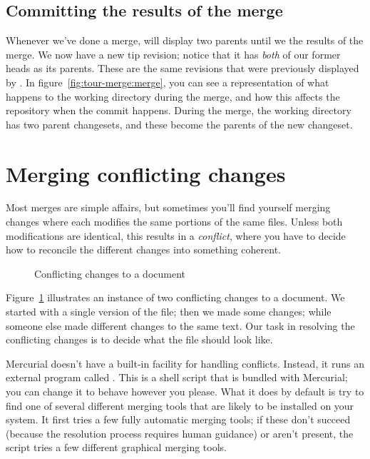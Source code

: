 \subsection{Committing the results of the merge}

Whenever we've done a merge,  will display two parents
until we  the results of the merge.
We now have a new tip revision; notice that it has \emph{both} of
our former heads as its parents.  These are the same revisions that
were previously displayed by .
In figure~\ref{fig:tour-merge:merge}, you can see a representation of
what happens to the working directory during the merge, and how this
affects the repository when the commit happens.  During the merge, the
working directory has two parent changesets, and these become the
parents of the new changeset.

\section{Merging conflicting changes}

Most merges are simple affairs, but sometimes you'll find yourself
merging changes where each modifies the same portions of the same
files.  Unless both modifications are identical, this results in a
\emph{conflict}, where you have to decide how to reconcile the
different changes into something coherent.

\begin{figure}[ht]
  \centering
  \caption{Conflicting changes to a document}
  \label{fig:tour-merge:conflict}
\end{figure}

Figure~\ref{fig:tour-merge:conflict} illustrates an instance of two
conflicting changes to a document.  We started with a single version
of the file; then we made some changes; while someone else made
different changes to the same text.  Our task in resolving the
conflicting changes is to decide what the file should look like.

Mercurial doesn't have a built-in facility for handling conflicts.
Instead, it runs an external program called .  This
is a shell script that is bundled with Mercurial; you can change it to
behave however you please.  What it does by default is try to find one
of several different merging tools that are likely to be installed on
your system.  It first tries a few fully automatic merging tools; if
these don't succeed (because the resolution process requires human
guidance) or aren't present, the script tries a few different
graphical merging tools.

